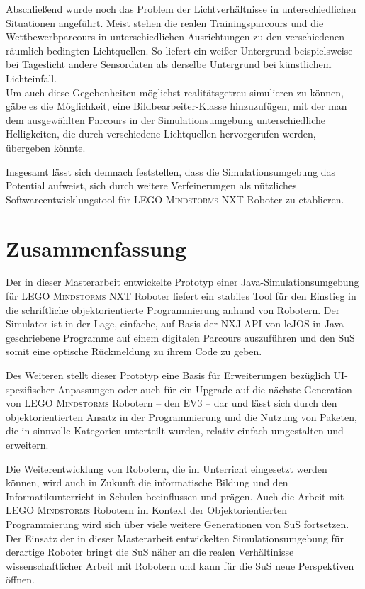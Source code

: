 \documentclass[paper=a4, DIV=calc, BCOR=12mm, twoside=on, onecolumn=on, open = right, titlepage =on, parskip =half-, headsepline = on, footsepline = off, chapterprefix = off, appendixprefix = on, fontsize = 12pt, numbers = noenddot, abstract = on]{scrbook}
\begin{document}
Abschließend wurde noch das Problem der Lichtverhältnisse in unterschiedlichen Situationen angeführt. Meist stehen die realen Trainingsparcours und die Wettbewerbparcours in unterschiedlichen Ausrichtungen zu den verschiedenen räumlich bedingten Lichtquellen. So liefert ein weißer Untergrund beispielsweise bei Tageslicht andere Sensordaten als derselbe Untergrund bei künstlichem Lichteinfall.\\
Um auch diese Gegebenheiten möglichst realitätsgetreu simulieren zu können, gäbe es die Möglichkeit, eine Bildbearbeiter-Klasse hinzuzufügen, mit der man dem ausgewählten Parcours in der Simulationsumgebung unterschiedliche Helligkeiten, die durch verschiedene Lichtquellen hervorgerufen werden, übergeben könnte.

Insgesamt lässt sich demnach feststellen, dass die Simulationsumgebung das Potential aufweist, sich durch weitere Verfeinerungen als nützliches Softwareentwicklungstool für \textsc{LEGO Mindstorms} NXT Roboter zu etablieren.

\section{Zusammenfassung}

Der in dieser Masterarbeit entwickelte Prototyp einer Java-Simulations\-um\-ge\-bung für \textsc{LEGO Mindstorms} NXT Roboter liefert ein stabiles Tool für den Einstieg in die schriftliche objektorientierte Programmierung anhand von Robotern. Der Simulator ist in der Lage, einfache, auf Basis der NXJ API von leJOS in Java geschriebene Programme auf einem digitalen Parcours auszuführen und den SuS somit eine optische Rückmeldung zu ihrem Code zu geben.

Des Weiteren stellt dieser Prototyp eine Basis für Erweiterungen bezüglich UI-spezifischer Anpassungen oder auch für ein Upgrade auf die nächste Generation von \textsc{LEGO Mindstorms} Robotern -- den EV3 -- dar und lässt sich durch den objektorientierten Ansatz in der Programmierung und die Nutzung von Paketen, die in sinnvolle Kategorien unterteilt wurden, relativ einfach umgestalten und erweitern.

Die Weiterentwicklung von Robotern, die im Unterricht eingesetzt werden können, wird auch in Zukunft die informatische Bildung und den Informatikunterricht in Schulen beeinflussen und prägen. Auch die Arbeit mit \textsc{LEGO Mindstorms} Robotern im Kontext der Objektorientierten Programmierung wird sich über viele weitere Generationen von SuS fortsetzen. Der Einsatz der in dieser Masterarbeit entwickelten Simulationsumgebung für derartige Roboter bringt die SuS näher an die realen Verhältinisse wissenschaftlicher Arbeit mit Robotern und kann für die SuS neue Perspektiven öffnen. 
\end{document}
